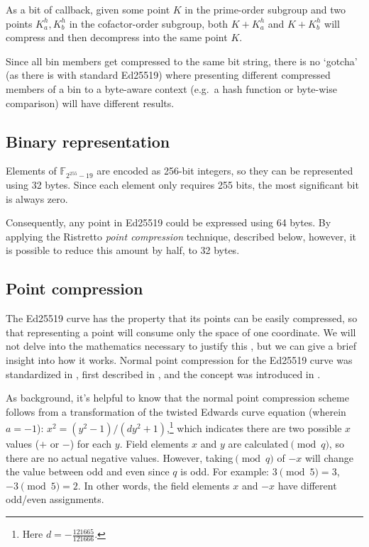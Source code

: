 As a bit of callback, given some point $K$ in the prime-order subgroup and two points $K^h_a, K^h_b$ in the cofactor-order subgroup, both $K + K^h_a$ and $K + K^h_b$ will compress and then decompress into the same point $K$.

Since all bin members get compressed to the same bit string, there is no `gotcha' (as there is with standard Ed25519) where presenting different compressed members of a bin to a byte-aware context (e.g.\ a hash function or byte-wise comparison) will have different results.


\subsection{Binary representation}
\label{subsec:binary_note}
Elements of \(\mathbb{F}_{2^{255} - 19} \) are encoded as 256-bit integers, so they can be represented using 32 bytes. Since each element only requires 255 bits, the most significant bit is always zero.

Consequently, any point in Ed25519 could be expressed using 64 bytes. By applying the Ristretto {\em point compression} technique, described below, however, it is possible to reduce this amount by half, to 32 bytes.


\subsection{Point compression}
\label{subsec:point-compression-section}

The Ed25519 curve has the property that its points can be easily compressed, so that representing a point will consume only the space of one coordinate. We will not delve into the mathematics necessary to justify this \cite{ristretto}, but we can give a brief insight into how it works. Normal point compression for the Ed25519 curve was standardized in \cite{eddsa-ed25519-irtf}, first described in \cite{Bernstein2012-high-speed-high-security-ed25519}, and the concept was introduced in \cite{Miller:point-compression-origin}.

As background, it's helpful to know that the normal point compression scheme follows from a transformation of the twisted Edwards curve equation (wherein $a = -1$): $x^2 = (y^2-1)/(d y^2+1)$,\footnote{Here $d = - \frac{121665}{121666}$.} which indicates there are two possible $x$ values ($+$ or $-$) for each $y$. Field elements $x$ and $y$ are calculated$\pmod{q}$, so there are no actual negative values. However, taking$\pmod{q}$ of $-x$ will change the value between odd and even since $q$ is odd. For example: $3 \pmod{5} = 3$, $-3 \pmod{5} = 2$. In other words, the field elements $x$ and $-x$ have different odd/even assignments.

